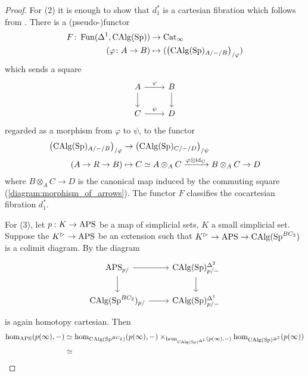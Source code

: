 \begin{proof}
    For (2) it is enough to show that $d_1^*$ is a cartesian fibration which follows from \cite[Corollary 2.4.6.5]{HTT}.  
    There is a (pseudo-)functor
    \begin{align*}
        F \colon \operatorname{Fun}(\Delta^1, \operatorname{CAlg}(\operatorname{Sp})) &\to \operatorname{Cat}_\infty \\
        (\varphi \colon A \to B) &\mapsto (\left(\operatorname{CAlg}(\operatorname{Sp})_{A/-/B}\right)_{/\varphi}) 
    \end{align*}
    which sends a square
    \begin{equation}\label{diagram:morphism_of_arrows}
    \begin{tikzcd}
        A \ar[r,"\varphi"] \ar[d] & B \ar[d] \\
        C \ar[r,"\psi"] & D 
    \end{tikzcd}
    \end{equation}
    regarded as a morphism from $ \varphi $ to $ \psi $, to the functor
    \begin{equation}
    \begin{split}
        \left(\operatorname{CAlg}(\operatorname{Sp})_{A/-/B}\right)_{/\varphi} &\to \left(\operatorname{CAlg}(\operatorname{Sp})_{C/-/D}\right)_{/\psi} \\
        (A \to R \to B) & \mapsto C \simeq A \otimes_A C \xrightarrow{\varphi \otimes \mathrm{id}_C} B \otimes_A C \to D
    \end{split}
    \end{equation}
    where $ B \otimes_A C \to D $ is the canonical map induced by the commuting square (\ref{diagram:morphism_of_arrows}). 
    The functor $ F $ classifies the cocartesian fibration $ d_1^* $. 

    For (3), let $p:K\to \mathrm{APS}$ be a map of simplicial sets, $K$ a small simplicial set. Suppose the $K^\vartriangleright\to \mathrm{APS}$ be an extension such that $K^\vartriangleright\to \mathrm{APS}\to \operatorname{CAlg}(\operatorname{Sp}^{BC_2})$ is a colimit diagram. By \cite[Proposition 2.4.3.2]{HTT} the diagram \[\begin{tikzcd}
        \aps_{p/}\arrow[r]\arrow[d] &\CAlg(\Spectra)^{\Delta^2}_{p/-}\arrow[d]\\
        \CAlg(\Spectra^{BC_2})_{p/}\arrow[r] & \CAlg(\Spectra)^{\Delta^1}_{p/-}
    \end{tikzcd}\] is again homotopy cartesian. Then 
    \begin{align*}
        \hom_{\mathrm{APS}}(p(\infty), -)&\simeq \hom_{\operatorname{CAlg}(\operatorname{Sp}^{BC_2})}(p(\infty), -)\times_{\hom_{\operatorname{CAlg}(\operatorname{Sp})^{\Delta^1}}(p(\infty),-)}\hom_{\operatorname{CAlg}(\operatorname{Sp})^{\Delta^2}}(p(\infty))\\
        &\simeq 
    \end{align*}
\end{proof}

